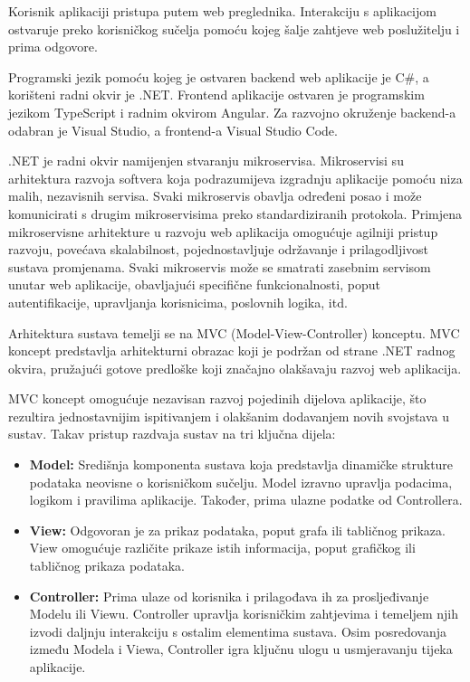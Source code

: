 			{Korisnik aplikaciji pristupa putem web preglednika. Interakciju s aplikacijom ostvaruje preko korisničkog sučelja pomoću kojeg šalje zahtjeve web poslužitelju i prima odgovore.
				
				Programski jezik pomoću kojeg je ostvaren backend web aplikacije je C\#, a korišteni radni okvir je .NET. Frontend aplikacije ostvaren je programskim jezikom
				TypeScript i radnim okvirom Angular. Za razvojno okruženje backend-a odabran je Visual Studio, a frontend-a Visual Studio Code.
				
				.NET je radni okvir namijenjen stvaranju mikroservisa. Mikroservisi su arhitektura razvoja softvera koja podrazumijeva izgradnju aplikacije pomoću niza malih, nezavisnih servisa. Svaki mikroservis obavlja određeni posao i može komunicirati s drugim mikroservisima preko standardiziranih protokola. Primjena mikroservisne arhitekture u razvoju web aplikacija omogućuje agilniji pristup razvoju, povećava skalabilnost, pojednostavljuje održavanje i prilagodljivost sustava promjenama. Svaki mikroservis može se smatrati zasebnim servisom unutar web aplikacije, obavljajući specifične funkcionalnosti, poput autentifikacije, upravljanja korisnicima, poslovnih logika, itd.
				
				Arhitektura sustava temelji se na MVC (Model-View-Controller) konceptu. MVC koncept predstavlja arhitekturni obrazac koji je podržan od strane .NET radnog okvira, pružajući gotove predloške koji značajno olakšavaju razvoj web aplikacija.
				
				MVC koncept omogućuje nezavisan razvoj pojedinih dijelova aplikacije, što rezultira jednostavnijim ispitivanjem i olakšanim dodavanjem novih svojstava u sustav. Takav pristup razdvaja sustav na tri ključna dijela:
				
				\begin{itemize}
					\item \textbf{Model:} Središnja komponenta sustava koja predstavlja dinamičke strukture podataka neovisne o korisničkom sučelju. Model izravno upravlja podacima, logikom i pravilima aplikacije. Također, prima ulazne podatke od Controllera.
					
					\item \textbf{View:} Odgovoran je za prikaz podataka, poput grafa ili tabličnog prikaza. View omogućuje različite prikaze istih informacija, poput grafičkog ili tabličnog prikaza podataka.
					
					\item \textbf{Controller:} Prima ulaze od korisnika i prilagođava ih za prosljeđivanje Modelu ili Viewu. Controller upravlja korisničkim zahtjevima i temeljem njih izvodi daljnju interakciju s ostalim elementima sustava. Osim posredovanja između Modela i Viewa, Controller igra ključnu ulogu u usmjeravanju tijeka aplikacije.
				\end{itemize}
				
}
